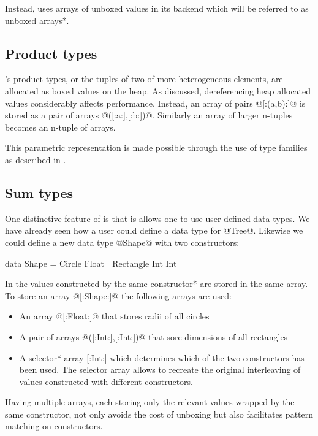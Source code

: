 \documentclass[preamble.tex]{subfiles}
\begin{document}
Instead, \DPH uses arrays of unboxed values in its backend which will be referred to as \*unboxed arrays*.


\subsection{Product types}

\Haskell's product types, or the tuples of two of more heterogeneous elements, are allocated as boxed values on the heap. As discussed, dereferencing heap allocated values considerably affects performance. Instead, an array of pairs @[:(a,b):]@ is stored as a pair of arrays @([:a:],[:b:])@. Similarly an array of larger n-tuples becomes an n-tuple of arrays.

This parametric representation is made possible through the use of type families as described in \cite{CDL09}.


\subsection{Sum types}

One distinctive feature of \DPH is that is allows one to use user defined data types. We have already seen how a user could define a data type for @Tree@. Likewise we could define a new data type @Shape@ with two constructors:

\begin{hscode}
data Shape = Circle Float
           | Rectangle Int Int
\end{hscode}

In \DPH the values constructed by the \*same constructor* are stored in the same array. To store an array @[:Shape:]@ the following arrays are used:
\begin{itemize}
\item An array @[:Float:]@ that stores radii of all circles
\item A pair of arrays @([:Int:],[:Int:])@ that sore dimensions of all rectangles
\item A \*selector* array [:Int:] which determines which of the two constructors has been used. The selector array allows to recreate the original interleaving of values constructed with different constructors.
\end{itemize}

Having multiple arrays, each storing only the relevant values wrapped by the same constructor, not only avoids the cost of unboxing but also facilitates pattern matching on constructors.
\end{document}
